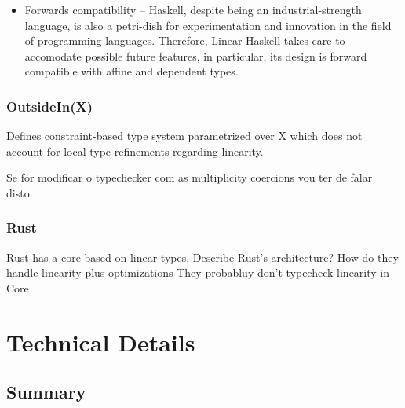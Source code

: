\documentclass[]{lwnovathesis}
\begin{document}
\begin{itemize}
    \item Forwards compatibility -- Haskell, despite being an
        industrial-strength language, is also a petri-dish for experimentation
        and innovation in the field of programming languages. Therefore, Linear
        Haskell takes care to accomodate possible future features, in
        particular, its design is forward compatible with affine and dependent
        types.
\end{itemize}


\subsection{OutsideIn(X)\label{related-work-gadts}}

Defines constraint-based type system parametrized over X which does not account
for local type refinements regarding linearity.

Se for modificar o typechecker com as multiplicity coercions vou ter de falar
disto.

\subsection{Rust}

Rust has a core based on linear types. Describe Rust's architecture?
How do they handle linearity plus optimizations
They probabluy don't typecheck linearity in Core

\chapter{Technical Details}




\section{Summary}
\end{document}
